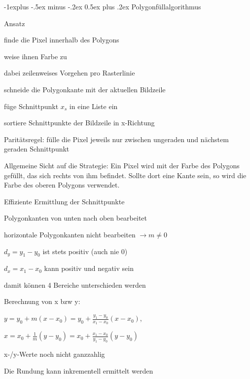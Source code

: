 \documentclass[landscape]{article}
\makeatletter
\renewcommand{\subsection}{\@startsection{subsection}{2}{0mm}%
                                {-1explus -.5ex minus -.2ex}%
                                {0.5ex plus .2ex}%
                                {\normalfont\normalsize\bfseries}}
\makeatother
\begin{document}
\begin{multicols}{3}
  \subsection{Polygonfüllalgorithmus}
  \begin{itemize*}
    \item Ansatz
    \begin{itemize*}
      \item finde die Pixel innerhalb des Polygons
      \item weise ihnen Farbe zu
      \item dabei zeilenweises Vorgehen pro Rasterlinie
      \item schneide die Polygonkante mit der aktuellen Bildzeile
      \item füge Schnittpunkt $x_s$ in eine Liste ein
      \item sortiere Schnittpunkte der Bildzeile in x-Richtung
      \item Paritätsregel: fülle die Pixel jeweils nur zwischen ungeraden und nächstem geraden Schnittpunkt
    \end{itemize*}
    \item Allgemeine Sicht auf die Strategie: Ein Pixel wird mit der Farbe des Polygons gefüllt, das sich rechts von ihm befindet. Sollte dort eine Kante sein, so wird die Farbe des oberen Polygons verwendet.
    \item Effiziente Ermittlung der Schnittpunkte
    \begin{itemize*}
      \item Polygonkanten von unten nach oben bearbeitet
      \item horizontale Polygonkanten nicht bearbeiten $\rightarrow m\not=0$
      \item $d_y = y_1 - y_0$ ist stets positiv (auch nie 0)
      \item $d_x = x_1 - x_0$ kann positiv und negativ sein
      \item damit können 4 Bereiche unterschieden werden
      \item Berechnung von x bzw y: 
      \begin{itemize*}
        \item $y=y_0+m(x-x_0)= y_0+\frac{y_1-y_0}{x_1-x_0}(x-x_0)$,
        \item $x=x_0+\frac{1}{m}(y-y_0)= x_0+\frac{x_1-x_0}{y_1-y_0}(y-y_0)$
      \end{itemize*}
      \item x-/y-Werte noch nicht ganzzahlig
      \item Die Rundung kann inkrementell ermittelt werden

\end{itemize*}
\end{itemize*}
\end{multicols}
\end{document}
